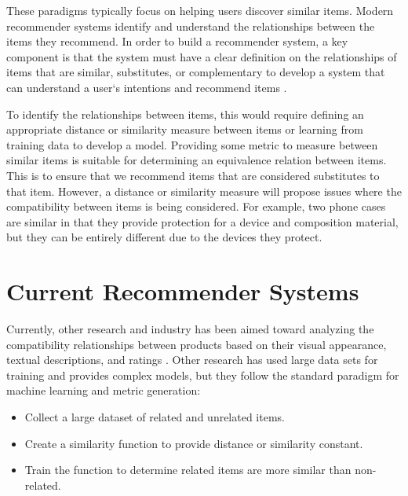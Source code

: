 
These paradigms typically focus on helping users discover similar items. Modern recommender systems identify and understand the relationships between the items they recommend. In order to build a recommender system, a key component is that the system must have a clear definition on the relationships of items that are similar, substitutes, or complementary to develop a system that can understand a user`s intentions and recommend items \cite{linden-smith-york}.

To identify the relationships between items, this would require defining an appropriate distance or similarity measure between items or learning from training data to develop a model. Providing some metric to measure between similar items is suitable for determining an equivalence relation between items. This is to ensure that we recommend items that are considered substitutes to that item. However, a distance or similarity measure will propose issues where the compatibility between items is being considered. For example, two phone cases are similar in that they provide protection for a device and composition material, but they can be entirely different due to the devices they protect.

\section{Current Recommender Systems}
Currently, other research and industry has been aimed toward analyzing the compatibility relationships between products based on their visual appearance, textual descriptions, and ratings \cite{mcauley-pandey-leskovec, mcauley-targett-shi-hengel, menon-elkan}. Other research has used large data sets for training and provides complex models, but they follow the standard paradigm for machine learning and metric generation:

\begin{itemize}
    \item Collect a large dataset of related and unrelated items.
    \item Create a similarity function to provide distance or similarity constant.
    \item Train the function to determine related items are more similar than non-related.
\end{itemize}

